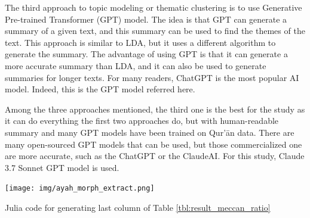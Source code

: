The third approach to topic modeling or thematic clustering is to use Generative Pre-trained Transformer (GPT) model. The idea is that GPT can generate a summary of a given text, and this summary can be used to find the themes of the text. This approach is similar to LDA, but it uses a different algorithm to generate the summary. The advantage of using GPT is that it can generate a more accurate summary than LDA, and it can also be used to generate summaries for longer texts. For many readers, ChatGPT is the most popular AI model. Indeed, this is the GPT model referred here. 

Among the three approaches mentioned, the third one is the best for the study as it can do everything the first two approaches do, but with human-readable summary and many GPT models have been trained on Qur'\=an data. There are many open-sourced GPT models that can be used, but those commercialized one are more accurate, such as the ChatGPT or the ClaudeAI. For this study, Claude 3.7 Sonnet GPT model is used.

\begin{listing2}[!t]
    \centering
    \texttt{[image: img/ayah\_morph\_extract.png]}
    \caption{Julia code for generating last column of Table \ref{tbl:result_meccan_ratio}}
    \label{fig:result_thematic_analysis}
\end{listing2}

